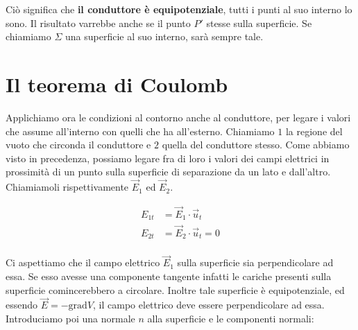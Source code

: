 \begin{figure}[htpb]
\end{figure}
\FloatBarrier

Ciò significa che \textbf{il conduttore è equipotenziale}, tutti i punti al suo interno lo sono. Il risultato varrebbe anche se il punto $P'$ stesse sulla superficie. Se chiamiamo $ \Sigma  $ una superficie al suo interno, sarà sempre tale.

\section{Il teorema di Coulomb}

Applichiamo ora le condizioni al contorno anche al conduttore, per legare i valori che assume all'interno con quelli che ha all'esterno. Chiamiamo $1$ la regione del vuoto che circonda il conduttore e $2$ quella del conduttore stesso. Come abbiamo visto in precedenza, possiamo legare fra di loro i valori dei campi elettrici in prossimità di un punto sulla superficie di separazione da un lato e dall'altro. Chiamiamoli rispettivamente $\vec{E}_1$ ed $\vec{E}_2$.

\begin{align*}
	E_{1t} &= \vec{E}_1\cdot \vec{u}_t \\
	E_{2t} &= \vec{E}_2\cdot \vec{u}_t = 0\\
\end{align*}

Ci aspettiamo che il campo elettrico $\vec{E}_1$ sulla superficie sia perpendicolare ad essa. Se esso avesse una componente tangente infatti le cariche presenti sulla superficie comincerebbero a circolare. Inoltre tale superficie è equipotenziale, ed essendo $ \vec{E} = -\text{grad}V $, il campo elettrico deve essere perpendicolare ad essa. Introduciamo poi una normale $n$ alla superficie e le componenti normali:


